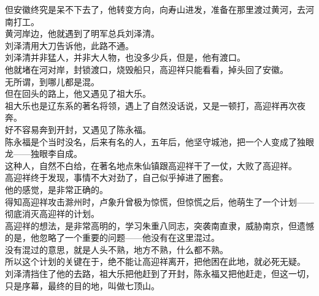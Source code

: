 \begin{multicols}{\theparacolNo}
但安徽终究是呆不下去了，他转变方向，向寿山进发，准备在那里渡过黄河，去河南打工。\\

黄河岸边，他就遇到了明军总兵刘泽清。\\

刘泽清用大刀告诉他，此路不通。\\

刘泽清并非猛人，并非大人物，也没多少兵，但是，他有渡口。\\

他就堵在河对岸，封锁渡口，烧毁船只，高迎祥只能看看，掉头回了安徽。\\

无所谓，到哪儿都是混。\\

但在回头的路上，他又遇见了祖大乐。\\

祖大乐也是辽东系的著名将领，遇上了自然没话说，又是一顿打，高迎祥再次夜奔。\\

好不容易奔到开封，又遇见了陈永福。\\

陈永福是个当时没名，后来有名的人，五年后，他坚守城池，把一个人变成了独眼龙——独眼李自成。\\

这种人，自然不白给，在著名地点朱仙镇跟高迎祥干了一仗，大败了高迎祥。\\

高迎祥终于发现，事情不大对劲了，自己似乎掉进了圈套。\\

他的感觉，是非常正确的。\\

得知高迎祥攻击滁州时，卢象升曾极为惊慌，但惊慌之后，他萌生了一个计划——彻底消灭高迎祥的计划。\\

高迎祥的想法，是非常高明的，学习朱重八同志，突袭南直隶，威胁南京，但遗憾的是，他忽略了一个重要的问题——他没有在这里混过。\\

没有混过的意思，就是人头不熟，地方不熟，什么都不熟。\\

所以这个计划的关键在于，绝不能让高迎祥离开，把他困在此地，就必死无疑。\\

刘泽清挡住了他的去路，祖大乐把他赶到了开封，陈永福又把他赶走，但这一切，只是序幕，最终的目的地，叫做七顶山。\\


\end{multicols}
